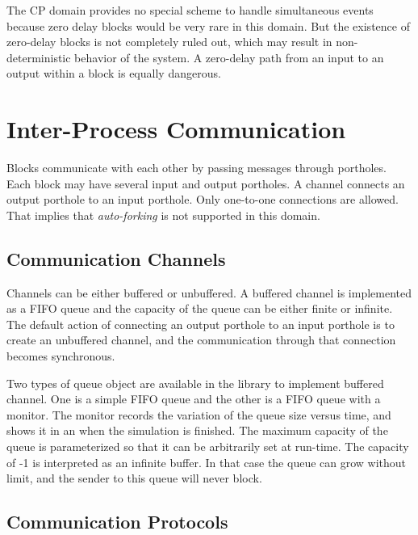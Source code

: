 The CP domain provides no special scheme to handle simultaneous events
because zero delay blocks would be very rare in this domain.  But the
existence of zero-delay blocks is not completely ruled out, which may
result in non-deterministic behavior of the system.   A zero-delay
path from an input to an output within a block is equally dangerous.

\section{Inter-Process Communication}
\label{Inter-Process Communication}

Blocks communicate with each other by passing messages through
portholes.  
Each block may have several input and output portholes.  A
channel connects an output porthole to an input porthole.  Only
one-to-one connections are allowed.  That implies that \emph{auto-forking}
is not supported in this domain.

\subsection{Communication Channels}
\label{Communication Channels}

Channels can be either buffered or unbuffered.  A buffered channel
is implemented as a FIFO queue and the capacity of the queue can be
either finite or infinite.  The default action of connecting an output
porthole to an input porthole is to create an unbuffered channel, and
the communication through that connection becomes synchronous.  

\begin{ifhtml}
Two types of queue object are available in the library to implement
buffered channel.  One is a simple FIFO queue and the other is a FIFO
queue with a monitor.  The monitor records the variation of the queue
size versus time, and shows it in an  when the simulation
is finished.  The maximum capacity of the queue is parameterized so
that it can be arbitrarily set at run-time.   The capacity of -1 is
interpreted as an infinite buffer.  In that case the queue can grow
without limit, and the sender to this queue will never block.
\end{ifhtml}

\subsection{Communication Protocols}
\label{Communication Protocols}

